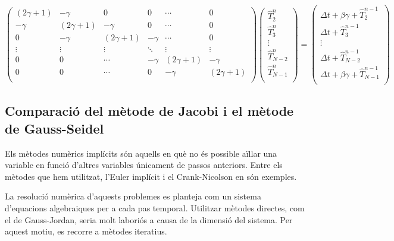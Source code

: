 \documentclass[11pt]{article}
\begin{document}
\begin{equation}
  \begin{pmatrix}
    (2\gamma + {1}) & {-\gamma} & {0} & {0} & \cdots & {0} \\
    {-\gamma} & (2\gamma + {1}) & {-\gamma} & {0} & \cdots & {0} \\
    {0} & {-\gamma} & (2\gamma + {1}) & {-\gamma} & \cdots & {0} \\
    \vdots & \vdots & \vdots & \ddots & \vdots & \vdots \\
    {0} & {0} & \cdots & {-\gamma} & (2\gamma + {1}) & {-\gamma} \\
    {0} & {0} & \cdots & {0} & {-\gamma} & (2\gamma + {1}) \\
  \end{pmatrix}
  \begin{pmatrix}
    \hat{T}_{2}^{n} \\
    \hat{T}_{3}^{n} \\
    \vdots \\
    \hat{T}_{N-2}^{n} \\
    \hat{T}_{N-1}^{n} \\
  \end{pmatrix}
  =
  \begin{pmatrix}
    \Delta t + \beta\gamma + \hat{T}^{n-1}_2 \\
    \Delta t + \hat{T}^{n-1}_3 \\
    \vdots \\
    \Delta t + \hat{T}^{n-1}_{N-2} \\
    \Delta t + \beta\gamma + \hat{T}^{n-1}_{N-1} \\
  \end{pmatrix}
  \label{matriu implicit}
\end{equation}



\subsection{Comparació del mètode de Jacobi i el mètode de Gauss-Seidel}
\label{subsec: comparacio jacobi gs}

Els mètodes numèrics implícits són aquells en què no és possible aïllar una variable en funció d'altres variables únicament de passos anteriors. Entre els mètodes que hem utilitzat, l’Euler implícit i el Crank-Nicolson en són exemples.

La resolució numèrica d’aquests problemes es planteja com un sistema d’equacions algebraiques per a cada pas temporal. Utilitzar mètodes directes, com el de Gauss-Jordan, seria molt laboriós a causa de la dimensió del sistema. Per aquest motiu, es recorre a mètodes iteratius.
\end{document}
